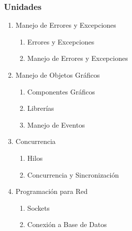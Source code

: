 
\begin{frame}

\frametitle{Unidades }

\begin{enumerate}
\item Manejo de Errores y Excepciones
\begin{enumerate}
\item Errores y Excepciones
\item Manejo de Errores y Excepciones
\end{enumerate}
\item Manejo de Objetos Gráficos
\begin{enumerate}
\item Componentes Gráficos
\item Librerías
\item Manejo de Eventos
\end{enumerate}
\item Concurrencia
\begin{enumerate}
\item Hilos
\item Concurrencia y Sincronización
\end{enumerate}
\item Programación para Red
\begin{enumerate}
\item Sockets
\item Conexión a Base de Datos
\end{enumerate}

\end{enumerate}

\end{frame}
